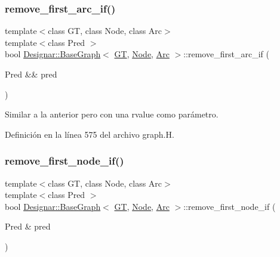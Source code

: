 \subsubsection{\texorpdfstring{remove\+\_\+first\+\_\+arc\+\_\+if()}{remove\_first\_arc\_if()}\hspace{0.1cm}{\footnotesize\ttfamily [2/2]}}
{\footnotesize\ttfamily template$<$class GT, class Node, class Arc$>$ \\
template$<$class Pred $>$ \\
bool \hyperlink{class_designar_1_1_base_graph}{Designar\+::\+Base\+Graph}$<$ \hyperlink{demo-buildgraph_8_c_a3001c40d2c31ca87ed96cd7d1334a55e}{GT}, \hyperlink{namespace_designar_a5af326c65aa2bd26b26c410f2030d09e}{Node}, \hyperlink{namespace_designar_a3f55fb5513d62ff47cbc8f72b8e95d6f}{Arc} $>$\+::remove\+\_\+first\+\_\+arc\+\_\+if (\begin{DoxyParamCaption}\item[{Pred \&\&}]{pred }\end{DoxyParamCaption})\hspace{0.3cm}{\ttfamily [inline]}}



Similar a la anterior pero con una rvalue como parámetro. 



Definición en la línea 575 del archivo graph.\+H.

\mbox{\label{class_designar_1_1_base_graph_a1311af417ba4d373d7051b73cc2696ec}} 
\subsubsection{\texorpdfstring{remove\+\_\+first\+\_\+node\+\_\+if()}{remove\_first\_node\_if()}\hspace{0.1cm}{\footnotesize\ttfamily [1/2]}}
{\footnotesize\ttfamily template$<$class GT, class Node, class Arc$>$ \\
template$<$class Pred $>$ \\
bool \hyperlink{class_designar_1_1_base_graph}{Designar\+::\+Base\+Graph}$<$ \hyperlink{demo-buildgraph_8_c_a3001c40d2c31ca87ed96cd7d1334a55e}{GT}, \hyperlink{namespace_designar_a5af326c65aa2bd26b26c410f2030d09e}{Node}, \hyperlink{namespace_designar_a3f55fb5513d62ff47cbc8f72b8e95d6f}{Arc} $>$\+::remove\+\_\+first\+\_\+node\+\_\+if (\begin{DoxyParamCaption}\item[{Pred \&}]{pred }\end{DoxyParamCaption})\hspace{0.3cm}{\ttfamily [inline]}}



